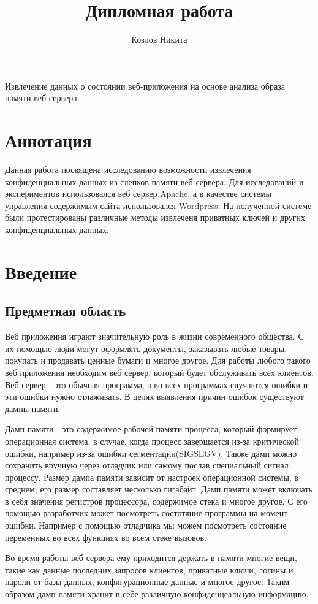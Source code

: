 \documentclass[20pt]{article}
\title{Дипломная работа}
\author{Козлов Никита}
\begin{document}
{\huge Извлечение данных о состоянии веб-приложения на основе анализа образа памяти веб-сервера}

\newpage

\section*{Аннотация}
Данная работа посвящена исследованию возможности извлечения конфиденциальных
данных из слепков памяти веб сервера. Для исследований и экспериментов
использовался веб сервер Apache, а в качестве системы управления содержимым
сайта использовался Wordpress. На полученной системе были протестированы
различные методы извлеченя приватных ключей и других конфиденциальных данных.

\newpage

\tableofcontents

\newpage

\section{Введение}

\subsection{Предметная область}
Веб приложения играют значительную роль в жизни современного общества. С их помощью
люди могут оформлять документы, заказывать любые товары, покупать и продавать ценные
бумаги и многое другое. Для работы любого такого веб приложения необходим веб сервер,
который будет обслуживать всех клиентов. Веб сервер - это обычная программа, а во
всех программах случаются ошибки и эти ошибки нужно отлаживать. В целях выявления
причин ошибок существуют дампы памяти.

Дамп памяти - это содержимое рабочей памяти процесса, который формирует операционная
система, в случае, когда процесс завершается из-за критической ошибки, например
из-за ошибки сегментации(SIGSEGV). Также дамп можно сохранить вручную через отладчик
или самому послав специальный сигнал процессу. Размер дампа памяти зависит от настроек
операционной системы, в среднем, его размер составляет несколько гигабайт. Дамп
памяти может включать в себя значения регистров процессора, содержимое стека и
многое другое. С его помощью разработчик может посмотреть состотяние программы
на момент ошибки. Например с помощью отладчика мы можем посмотреть состояние
переменных во всех функциях во всем стеке вызовов.

Во время работы веб сервера ему приходится держать в памяти многие вещи, такие
как данные последних запросов клиентов, приватные ключи, логины и пароли от базы
данных, конфигурационные данные и многое другое. Таким образом дамп памяти
хранит в себе различную конфиденцеальную информацию.
\end{document}
